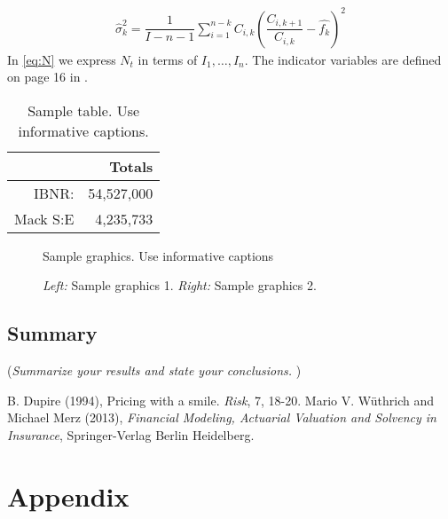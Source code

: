 \documentclass[a4paper]{article}
\begin{document}
\begin{align}\label{eq:N}
	\hat{\sigma}_k^2 = \dfrac{1}{I-n-1} \sum_{i=1}^{n-k} C_{i,k}\left( \dfrac{ C_{i,k+1}}{ C_{i,k}} -\hat{f_k} \right)^2
\end{align}
In \eqref{eq:N} we express $N_t$ in terms of $I_1,\dots,I_n$. The indicator variables are defined on page 16 in \cite{Wuthrich-Merz-13}.

\begin{table}[!ht]
\center
\begin{tabular}{rr}
	& Totals \\ 
\hline
IBNR: & 54,527,000 \\
Mack S:E & 4,235,733\\
\hline
\end{tabular}
\caption{Sample table. Use informative captions.} \label{tab:sampletab}
\end{table}


 \begin{figure}[!ht]
 \center
  \caption{Sample graphics. Use informative captions}
  \label{fig:samplefig1}
\end{figure}


 \begin{figure}[!ht]
 \center
  \caption{\emph{Left:} Sample graphics 1. \emph{Right:} Sample graphics 2.}
  \label{fig:samplefig2}
\end{figure}


\subsection*{Summary}
({\it Summarize your results and state your conclusions. })



\begin{thebibliography}{99}
B. Dupire (1994),
Pricing with a smile.
\emph{Risk}, 7, 18-20.
  Mario V. W\"{u}thrich and Michael Merz (2013),
  \emph{Financial Modeling, Actuarial Valuation and Solvency in Insurance},
  Springer-Verlag Berlin Heidelberg.
\end{thebibliography}


\section*{Appendix}
\end{document}
